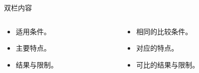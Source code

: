 \begin{frame}{双栏内容}
  \begin{columns}[T,onlytextwidth]
    \begin{column}{\hitleftwidth}
      \begin{itemize}
        \item 适用条件。
        \item 主要特点。
        \item 结果与限制。
      \end{itemize}
    \end{column}
    \begin{column}{\hitrightwidth}
      \begin{itemize}
        \item 相同的比较条件。
        \item 对应的特点。
        \item 可比的结果与限制。
      \end{itemize}
    \end{column}
  \end{columns}
\end{frame}
